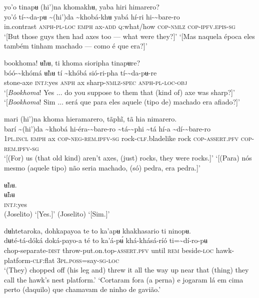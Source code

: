 \documentclass[output=paper,
modfonts,nonflat
]{langsci/langscibook}
\begin{document}
\ea yo'o tinapʉ (hi')na khomakhʉ, yaba hiri himarero? \\[.3em]
\gll yo'ó	tí-{\textasciitilde}da-pʉ	{\textasciitilde}(hi')da	{\textasciitilde}khobá-khʉ	yabá	hí-ri	hi-{\textasciitilde}bare-ro \\
     in.contrast	\textsc{anph-pl-loc}	\textsc{emph}	ax-\textsc{add}	\textsc{q:}what/how	\textsc{cop-nmlz}	\textsc{cop-ipfv.epis-sg}\\
\glt ‘[But those guys then had axes too — what were they?]’
\glt ‘[Mas naquela época eles também tinham machado — como é que era?]’
\z 

\largerpage[2]
\ea bookhoma! ʉ̃hʉ, ti khoma sioripha tinapʉre? \\[.3em]
\gll bóó-{\textasciitilde}khómá	ʉ̃hʉ	tí	{\textasciitilde}khóbá	sió-ri-pha	tí-{\textasciitilde}da-pʉ-re \\
     stone-axe	\textsc{intj:}yes	\textsc{anph}	ax	sharp\textsc{-nmlz-spec}	\textsc{anph-pl-loc-obj}\\
\glt ‘[\textit{Bookhoma}! Yes ... do you suppose to them that (kind of) axe{\footnotemark} was sharp?]’
\newpage 
\glt ‘[\textit{Bookhoma}! Sim ... será que para eles aquele (tipo de) machado era afiado?]’
\z 

 
\ea mari (hi')na khoma hieramarero, tãphĩ, tã hia nimarero. \\[.3em]
\gll {\textasciitilde}barí	{\textasciitilde}(hi')da	{\textasciitilde}khobá	hi-éra-{\textasciitilde}bare-ro	{\textasciitilde}tá-{\textasciitilde}phi	{\textasciitilde}tá	hí-a	{\textasciitilde}dí-{\textasciitilde}bare-ro \\
     1\textsc{pl.incl}	\textsc{emph}	ax	\textsc{cop-neg-rem.ipfv-sg}	rock-\textsc{clf.}bladelike	rock	\textsc{cop-assert.pfv}	\textsc{cop-rem.ipfv-sg}\\
\glt ‘[(For) us (that old kind) aren't axes, (just) rocks, they were rocks.]’
\glt ‘[(Para) nós mesmo (aquele tipo) não seria machado, (só) pedra, era pedra.]’
\z 

\ea ʉ̃hʉ. \\[.3em]
\gll ʉ̃hʉ \\
     \textsc{intj:}yes\\
\glt (Joselito) ‘[Yes.]’
\glt (Joselito) ‘[Sim.]’
\z

\ea dʉhtetaroka, dohkapayoa te to ka'apʉ khakhasario ti ninopʉ. \\[.3em]
\gll dʉté-tá-dóká	doká-payo-a	té	to	ka'á-pʉ́ khá-khásá-ríó	ti={\textasciitilde}dí-ro-pʉ\\
     chop-separate-\textsc{dist}	throw-put.on.top-\textsc{assert.pfv}	until	\textsc{rem}	beside\textsc{-loc} hawk-platform-\textsc{clf}:flat	3\textsc{pl.poss}=say\textsc{-sg}\textsc{-loc}\\
\glt ‘(They) chopped off (his leg and) threw it all the way up near that (thing) they call the hawk's nest platform.’
\glt ‘Cortaram fora (a perna) e jogaram lá em cima perto (daquilo) que chamavam de ninho de gavião.’
\z 
\end{document}
